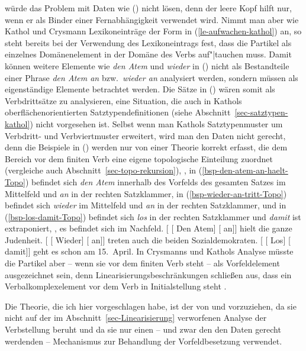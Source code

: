 würde das Problem mit Daten wie () nicht lösen, denn der leere Kopf hilft nur,
wenn er als Binder einer Fernabhängigkeit verwendet wird. Nimmt man aber wie Kathol und Crysmann
Lexikoneinträge der Form in (\ref{le-aufwachen-kathol}) an, so steht bereits bei der Verwendung
des Lexikoneintrags fest, dass die Partikel als einzelnes Domänenelement in der Domäne des Verbs auf"|tauchen muss.
Damit können weitere Elemente wie \emph{den Atem} und \emph{wieder} in () nicht als
Bestandteile einer Phrase \emph{den Atem an} bzw.\ \emph{wieder an} analysiert werden, sondern
müssen als eigenständige Elemente betrachtet werden. Die Sätze in () wären somit als
Verbdrittsätze zu analysieren, eine Situation, die auch in Kathols oberflächenorientierten
Satztypendefinitionen (siehe Abschnitt~\ref{sec-satztypen-kathol}) nicht vorgesehen ist. Selbst wenn man Kathols
Satztypenmuster um Verbdritt- und Verbviertmuster erweitert, wird man den Daten nicht gerecht, denn
die Beispiele in () werden nur von einer Theorie korrekt erfasst, die dem Bereich
vor dem finiten Verb eine eigene topologische Einteilung zuordnet (vergleiche auch Abschnitt~\ref{sec-topo-rekursion}),
\dash, in (\ref{bsp-den-atem-an-haelt-Topo}) befindet sich \emph{den Atem} innerhalb des Vorfelds
des gesamten Satzes im Mittelfeld und \emph{an} in der rechten Satzklammer,
in (\ref{bsp-wieder-an-tritt-Topo}) befindet sich \emph{wieder} im Mittelfeld und \emph{an} in der rechten Satzklammer,
und in (\ref{bsp-los-damit-Topo}) befindet sich \emph{los} in der rechten Satzklammer und \emph{damit}
ist extraponiert, \dash, es befindet sich im Nachfeld.
\eal
\label{bsp-partikel+anderes+material-topo-felder}
\ex\label{bsp-den-atem-an-haelt-Topo}
{}[ [ Den Atem] [ an]] hielt die ganze Judenheit.
\ex\label{bsp-wieder-an-tritt-Topo}
{}[ [ Wieder] [ an]] treten auch die beiden Sozialdemokraten.
\ex\label{bsp-los-damit-Topo}
{}[ [ Los] [ damit]] geht es schon am 15.\ April.
\zl
In Crysmanns und Kathols Analyse müsste die Partikel aber -- wenn sie vor dem finiten Verb
steht -- als Vorfeldelement ausgezeichnet sein, denn Linearisierungsbeschränkungen schließen
aus, dass ein Verbalkomplexelement vor dem Verb in Initialstellung steht \parencites[128]{Kathol95a}[50]{Kathol2001a}[]{Crysmann2002a}.%

Die Theorie, die ich hier vorgeschlagen habe, ist der von \citeauthor{Kathol95a} und \citeauthor{Crysmann2002a} vorzuziehen,
da sie nicht auf der im Abschnitt~\ref{sec-Linearisierung} verworfenen Analyse der Verbstellung 
beruht und da sie nur einen -- und zwar den den Daten gerecht werdenden -- 
Mechanismus zur Behandlung der Vorfeldbesetzung verwendet.

